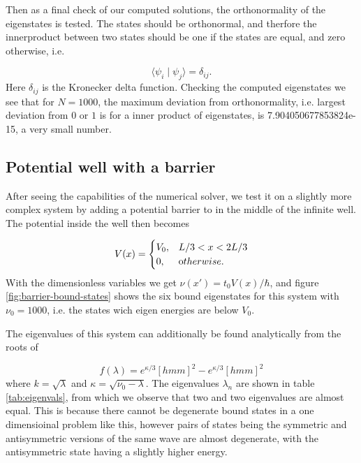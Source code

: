 \documentclass{article}
\begin{document}
Then as a final check of our computed solutions, the orthonormality of the eigenstates is tested. The states should be orthonormal, and therfore the innerproduct between two states should be one if the states are equal, and zero otherwise, i.e.

\begin{equation}
    \langle\psi_i \mid \psi_j\rangle = \delta_{ij}.
\end{equation}
Here $\delta_{ij}$ is the Kronecker delta function. Checking the computed eigenstates we see that for $N=1000$, the maximum deviation from orthonormality, i.e. largest deviation from $0$ or $1$ is for a inner product of eigenstates, is 7.904050677853824e-15, a very small number.

\subsection{Potential well with a barrier}
After seeing the capabilities of the numerical solver, we test it on a slightly more complex system by adding a potential barrier to in the middle of the infinite well. The potential inside the well then becomes

\begin{equation}
    V(x) = 
        \begin{cases}
            V_0, & L/3 < x < 2L/3\\
            0, & \text otherwise.
        \end{cases}
\end{equation}
With the dimensionless variables we get $\nu(x') = t_0 V(x)/\hbar$, and figure \ref{fig:barrier-bound-states} shows the six bound eigenstates for this system with $\nu_0 = 1000$, i.e. the states wich eigen energies are below $V_0$.

The eigenvalues of this system can additionally be found analytically from the roots of

\begin{equation}
    f(\lambda) = e^{\kappa/3} \left[ hmm \right]^2 - 
                e^{\kappa/3} \left[ hmm \right]^2
\end{equation}
where $k=\sqrt{\lambda}$ and $\kappa=\sqrt{\nu_0 - \lambda}$. The eigenvalues $\lambda_n$ are shown in table \ref{tab:eigenvals}, from which we observe that two and two eigenvalues are almost equal. This is because there cannot be degenerate bound states in a one dimensioinal problem like this, however pairs of states being the symmetric and antisymmetric versions of the same wave are almost degenerate, with the antisymmetric state having a slightly higher energy.
\end{document}
